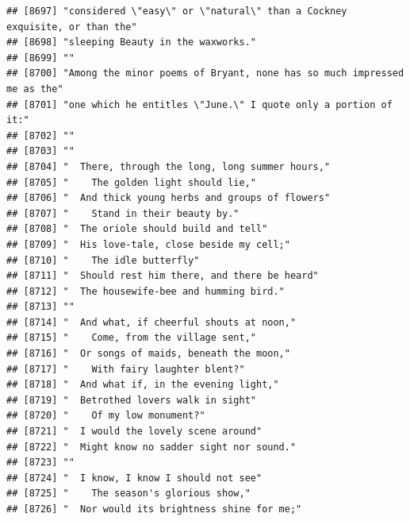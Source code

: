 \documentclass{article}\usepackage[]{graphicx}\usepackage[]{color}
\makeatletter
\newenvironment{kframe}{%
 \def\at@end@of@kframe{}%
 \ifinner\ifhmode%
  \def\at@end@of@kframe{\end{minipage}}%
  \begin{minipage}{\columnwidth}%
 \fi\fi%
 \def\FrameCommand##1{\hskip\@totalleftmargin \hskip-\fboxsep
 \colorbox{shadecolor}{##1}\hskip-\fboxsep
     \hskip-\linewidth \hskip-\@totalleftmargin \hskip\columnwidth}%
 \MakeFramed {\advance\hsize-\width
   \@totalleftmargin\z@ \linewidth\hsize
   \@setminipage}}%
 {\par\unskip\endMakeFramed%
 \at@end@of@kframe}
\newenvironment{knitrout}{}{} %
\makeatother
\begin{document}
\begin{knitrout}
\begin{kframe}
\begin{verbatim}
## [8697] "considered \"easy\" or \"natural\" than a Cockney exquisite, or than the"    
## [8698] "sleeping Beauty in the waxworks."                                            
## [8699] ""                                                                            
## [8700] "Among the minor poems of Bryant, none has so much impressed me as the"       
## [8701] "one which he entitles \"June.\" I quote only a portion of it:"               
## [8702] ""                                                                            
## [8703] ""                                                                            
## [8704] "  There, through the long, long summer hours,"                               
## [8705] "    The golden light should lie,"                                            
## [8706] "  And thick young herbs and groups of flowers"                               
## [8707] "    Stand in their beauty by."                                               
## [8708] "  The oriole should build and tell"                                          
## [8709] "  His love-tale, close beside my cell;"                                      
## [8710] "    The idle butterfly"                                                      
## [8711] "  Should rest him there, and there be heard"                                 
## [8712] "  The housewife-bee and humming bird."                                       
## [8713] ""                                                                            
## [8714] "  And what, if cheerful shouts at noon,"                                     
## [8715] "    Come, from the village sent,"                                            
## [8716] "  Or songs of maids, beneath the moon,"                                      
## [8717] "    With fairy laughter blent?"                                              
## [8718] "  And what if, in the evening light,"                                        
## [8719] "  Betrothed lovers walk in sight"                                            
## [8720] "    Of my low monument?"                                                     
## [8721] "  I would the lovely scene around"                                           
## [8722] "  Might know no sadder sight nor sound."                                     
## [8723] ""                                                                            
## [8724] "  I know, I know I should not see"                                           
## [8725] "    The season's glorious show,"                                             
## [8726] "  Nor would its brightness shine for me;"                                    

\end{verbatim}
\end{kframe}
\end{knitrout}
\end{document}
